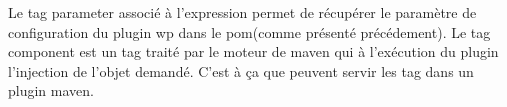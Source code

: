 Le tag parameter associé à l'expression permet de récupérer le paramètre de 
configuration du plugin wp dans le pom(comme présenté précédement). 
Le tag component est un tag traité par le moteur de maven qui à l'exécution
du plugin l'injection de l'objet demandé. C'est à ça que peuvent servir les 
tag dans un plugin maven. 





